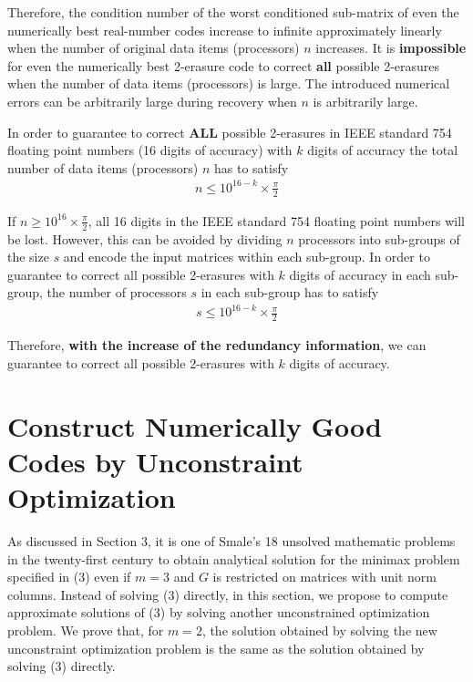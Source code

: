 \documentclass{sig-alternate}
\begin{document}
Therefore, the condition number of the worst conditioned sub-matrix
of even the numerically best real-number codes increase 
to infinite approximately linearly when the number of original data items (processors) $n$ increases.
It is {\bf impossible} for even the numerically best 2-erasure code to correct {\bf all}
possible 2-erasures when the number of data items (processors) is large.
The introduced numerical errors can be arbitrarily large during recovery when $n$ is arbitrarily large.

In order to  guarantee to correct {\bf ALL} possible 
2-erasures in IEEE standard 754  floating point numbers (16 digits of accuracy)  with $k$ digits of accuracy
the total number of data items (processors) $n$ has to satisfy
\begin{eqnarray}
n \leq 10^{16-k} \times \frac{\pi}{2}
\end{eqnarray}


If $n\geq 10^{16} \times \frac{\pi}{2}$, all 16 digits in the IEEE standard 754 floating point numbers
will be lost. However, this can be avoided by dividing $n$ processors into sub-groups of the size $s$ and encode
the input matrices within each sub-group.
In order to  guarantee to correct all possible 2-erasures with $k$ 
digits of accuracy in each sub-group, the number of processors $s$
in each sub-group has to satisfy
\begin{eqnarray*}
s \leq 10^{16-k} \times \frac{\pi}{2}
\end{eqnarray*}

Therefore, {\bf with the increase of the redundancy information}, we can 
guarantee to correct all possible 2-erasures with $k$ digits of accuracy.

\section{Construct Numerically Good Codes by Unconstraint Optimization}

As discussed in Section 3, it is one of Smale's 18 unsolved mathematic 
problems~\cite{smale:unsolved}
in the twenty-first century to obtain analytical solution for 
the minimax problem specified in (3) even if $m=3$ and $G$ is restricted 
on matrices with unit norm columns. Instead of solving (3) directly,
in this section, we propose to compute approximate solutions of (3) by solving
another unconstrained optimization problem.
We prove that, for $m=2$, the solution obtained by 
solving the new unconstraint optimization problem
is the same as the solution obtained by solving (3) directly.
\end{document}
